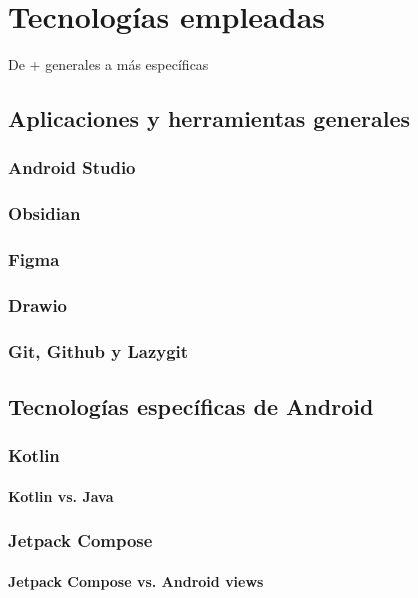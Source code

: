 \chapter{Tecnologías empleadas}
\label{cap:tecnologiasEmpleadas}
De + generales a más específicas

\section{Aplicaciones y herramientas generales}

\subsection{Android Studio}

\subsection{Obsidian}

\subsection{Figma}

\subsection{Drawio}

\subsection{Git, Github y Lazygit}

\section{Tecnologías específicas de Android}

\subsection{Kotlin}
\subsubsection{Kotlin vs. Java}

\subsection{Jetpack Compose}
\subsubsection{Jetpack Compose vs. Android views}

